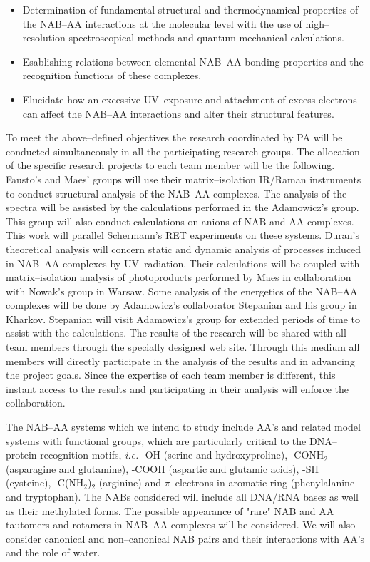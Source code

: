 \begin{itemize}

\item
Determination of fundamental structural and thermodynamical
properties of the NAB--AA interactions at the molecular level
with the use of
high--resolution spectroscopical methods and quantum mechanical
calculations.

\item
Esablishing relations between elemental NAB--AA bonding properties
and the recognition functions of these complexes.

\item
Elucidate how an excessive UV--exposure and attachment
of excess electrons can affect  
the NAB--AA interactions and alter their structural
features.

\end{itemize}

To meet the above--defined objectives the research 
coordinated by PA will be
conducted simultaneously in all the participating research
groups. The allocation of the specific research
projects
to each team member will be the following. Fausto's and Maes'
groups will use their matrix--isolation IR/Raman instruments to 
conduct structural analysis of the NAB--AA complexes. The
analysis of the spectra will be assisted by the calculations
performed in the Adamowicz's group. This group will also 
conduct calculations on anions of NAB and AA complexes.
This work will parallel Schermann's RET experiments on these
systems. Duran's theoretical analysis will concern static and dynamic
analysis of processes induced in NAB--AA complexes by UV--radiation.
Their calculations will be coupled with matrix--isolation
analysis of photoproducts performed by Maes in collaboration with
Nowak's group in Warsaw. Some analysis of the energetics
of the NAB--AA complexes will be done by Adamowicz's collaborator
Stepanian and his group in Kharkov. Stepanian will visit 
Adamowicz's group for extended periods of time to assist with the
calculations. The results of the research will be shared
with all team members through the specially designed web site.
Through this medium all members will directly participate in the 
analysis of the results and in advancing the project goals.
Since the expertise of each team member is different,
this instant access to the results and 
participating in their analysis
will enforce the collaboration.
 

The NAB--AA systems which we intend to study include AA's 
and related model systems with functional groups, which
are particularly critical to the 
DNA--protein recognition motifs, {\it i.e.}
-OH (serine and hydroxyproline), -CONH$_2$ (asparagine and
glutamine), -COOH (aspartic and glutamic acids),
-SH (cysteine), -C(NH$_2$)$_2$ (arginine) and $\pi$--electrons
in aromatic ring (phenylalanine and tryptophan). 
The NABs considered will include all DNA/RNA bases as
well as their methylated forms. The possible appearance
of "rare" NAB and AA tautomers and rotamers in NAB--AA
complexes will be considered. We will also consider
canonical and non--canonical NAB pairs and their interactions
with AA's and the role of water.

